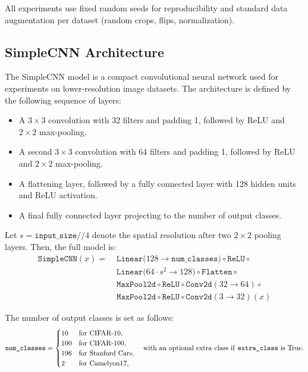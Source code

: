 All experiments use fixed random seeds for reproducibility and standard data augmentation per dataset (random crops, flips, normalization).


\subsection{SimpleCNN Architecture}
\label{app:simplecnn}

\noindent
The SimpleCNN model is a compact convolutional neural network used for experiments on lower-resolution image datasets. The architecture is defined by the following sequence of layers:
\begin{itemize}
  \item A $3 \times 3$ convolution with 32 filters and padding 1, followed by ReLU and $2 \times 2$ max-pooling.
  \item A second $3 \times 3$ convolution with 64 filters and padding 1, followed by ReLU and $2 \times 2$ max-pooling.
  \item A flattening layer, followed by a fully connected layer with 128 hidden units and ReLU activation.
  \item A final fully connected layer projecting to the number of output classes.
\end{itemize}

Let \( s = \texttt{input\_size} // 4 \) denote the spatial resolution after two $2\times2$ pooling layers. Then, the full model is:
\[
\begin{aligned}
\texttt{SimpleCNN}(x) =\;&
\texttt{Linear}\big(128 \to \texttt{num\_classes}\big) \circ \texttt{ReLU} \circ \\
&\texttt{Linear}\big(64 \cdot s^2 \to 128\big) \circ \texttt{Flatten} \circ \\
&\texttt{MaxPool2d} \circ \texttt{ReLU} \circ \texttt{Conv2d}(32 \to 64) \circ \\
&\texttt{MaxPool2d} \circ \texttt{ReLU} \circ \texttt{Conv2d}(3 \to 32)(x)
\end{aligned}
\]


\vspace{0.5em}
\noindent
The number of output classes is set as follows:
\[
\texttt{num\_classes} = 
\begin{cases}
10 & \text{for CIFAR-10}, \\
100 & \text{for CIFAR-100}, \\
196 & \text{for Stanford Cars}, \\
2 & \text{for Camelyon17}, \\
\end{cases}
\quad \text{with an optional extra class if \texttt{extra\_class} is True.}
\]

